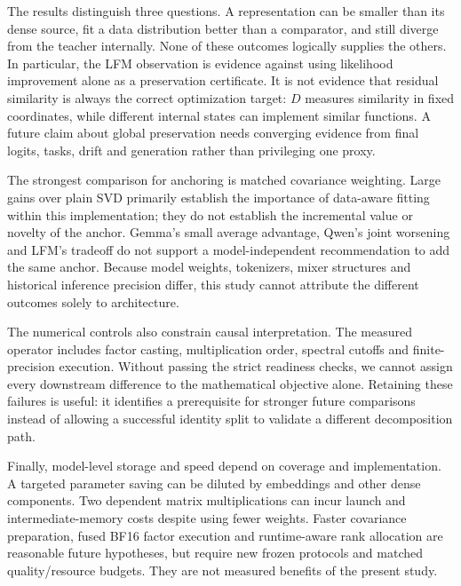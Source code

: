 \documentclass[10pt,a4paper,twocolumn]{article}
\makeatletter
\renewcommand\section{\@startsection{section}{1}{0pt}{2.2ex plus 1ex minus .2ex}{1.1ex plus .2ex}{\normalfont\normalsize\bfseries\centering}}
\makeatother
\begin{document}
\section{Discussion}
The results distinguish three questions. A representation can be smaller than its dense source, fit a data distribution better than a comparator, and still diverge from the teacher internally. None of these outcomes logically supplies the others. In particular, the LFM observation is evidence against using likelihood improvement alone as a preservation certificate. It is not evidence that residual similarity is always the correct optimization target: $D$ measures similarity in fixed coordinates, while different internal states can implement similar functions. A future claim about global preservation needs converging evidence from final logits, tasks, drift and generation rather than privileging one proxy.\par\smallskip
The strongest comparison for anchoring is matched covariance weighting. Large gains over plain SVD primarily establish the importance of data-aware fitting within this implementation; they do not establish the incremental value or novelty of the anchor. Gemma's small average advantage, Qwen's joint worsening and LFM's tradeoff do not support a model-independent recommendation to add the same anchor. Because model weights, tokenizers, mixer structures and historical inference precision differ, this study cannot attribute the different outcomes solely to architecture.\par\smallskip
The numerical controls also constrain causal interpretation. The measured operator includes factor casting, multiplication order, spectral cutoffs and finite-precision execution. Without passing the strict readiness checks, we cannot assign every downstream difference to the mathematical objective alone. Retaining these failures is useful: it identifies a prerequisite for stronger future comparisons instead of allowing a successful identity split to validate a different decomposition path.\par\smallskip
Finally, model-level storage and speed depend on coverage and implementation. A targeted parameter saving can be diluted by embeddings and other dense components. Two dependent matrix multiplications can incur launch and intermediate-memory costs despite using fewer weights. Faster covariance preparation, fused BF16 factor execution and runtime-aware rank allocation are reasonable future hypotheses, but require new frozen protocols and matched quality/resource budgets. They are not measured benefits of the present study.\par\smallskip
\end{document}
